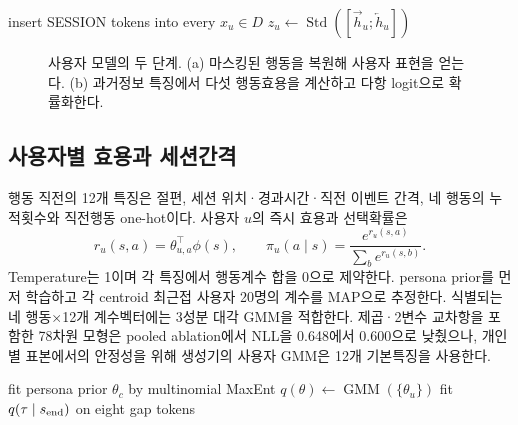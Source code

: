 \documentclass[9pt,twocolumn]{extarticle}
\begin{document}
\begin{algorithm}[t]
\caption{Masked GRU user representation}
\label{alg:gru}
insert SESSION tokens into every $x_u\in D$\;
$z_u\leftarrow\operatorname{Std}([\overrightarrow h_u;\overleftarrow h_u])$\;
\end{algorithm}

\begin{figure}[t]
\centering
\resizebox{0.84\textwidth}{!}{}
\caption{사용자 모델의 두 단계. (a) 마스킹된 행동을 복원해 사용자 표현을 얻는다.
(b) 과거정보 특징에서 다섯 행동효용을 계산하고 다항 logit으로 확률화한다.}
\label{fig:architecture}
\end{figure}

\subsection{사용자별 효용과 세션간격}
행동 직전의 12개 특징은 절편, 세션 위치·경과시간·직전 이벤트 간격, 네 행동의
누적횟수와 직전행동 one-hot이다. 사용자 $u$의 즉시 효용과 선택확률은
\begin{equation}
r_u(s,a)=\theta_{u,a}^{\top}\phi(s),\qquad
\pi_u(a\mid s)=\frac{e^{r_u(s,a)}}{\sum_b e^{r_u(s,b)}}.
\end{equation}
Temperature는 1이며 각 특징에서 행동계수 합을 0으로 제약한다. persona prior를
먼저 학습하고 각 centroid 최근접 사용자 20명의 계수를 MAP으로 추정한다. 식별되는
네 행동$\times$12개 계수벡터에는 3성분 대각 GMM을 적합한다. 제곱·2변수 교차항을
포함한 78차원 모형은 pooled ablation에서 NLL을 0.648에서 0.600으로 낮췄으나,
개인별 표본에서의 안정성을 위해 생성기의 사용자 GMM은 12개 기본특징을 사용한다.

\begin{algorithm}[t]
\caption{Persona-conditioned MaxEnt IRL}
\label{alg:irl}
fit persona prior $\theta_c$ by multinomial MaxEnt\;
$q(\theta)\leftarrow\operatorname{GMM}(\{\theta_u\})$\;
fit $q(\tau\mid s_{\rm end})$ on eight gap tokens\;
\end{algorithm}
\end{document}
